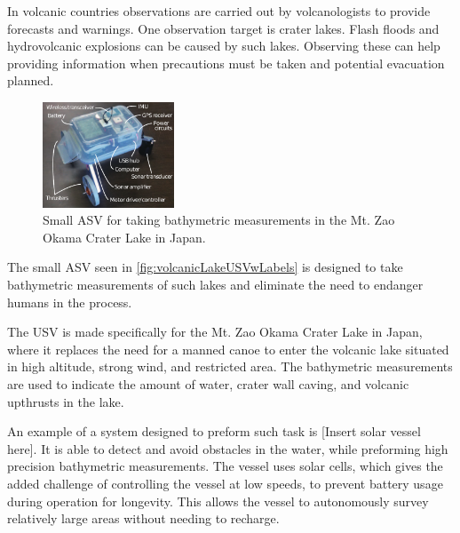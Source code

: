 In volcanic countries observations are carried out by volcanologists to provide forecasts and warnings. One observation target is crater lakes. Flash floods and hydrovolcanic explosions can be caused by such lakes. Observing these can help providing information when precautions must be taken and potential evacuation planned.\cite{AWatanabe}
%
\begin{figure}[H]
  \includegraphics[width=0.35\textwidth]{figures/volcanicLakeUSVwLabels.pdf}
  \caption{Small ASV for taking bathymetric measurements in the Mt. Zao Okama Crater Lake in Japan.\cite{AWatanabe}}
  \label{fig:volcanicLakeUSVwLabels}
\end{figure}
\vspace{-6mm}
%
The small ASV seen in \autoref{fig:volcanicLakeUSVwLabels} is designed to take bathymetric measurements of such lakes and eliminate the need to endanger humans in the process.\cite{AWatanabe}

The USV is made specifically for the Mt. Zao Okama Crater Lake in Japan, where it replaces the need for a manned canoe to enter the volcanic lake situated in high
altitude, strong wind, and restricted area. The bathymetric measurements are used to indicate the amount of water, crater wall caving, and volcanic upthrusts in the lake.\cite{AWatanabe}

An example of a system designed to preform such task is [Insert solar vessel here]. 
It is able to detect and avoid obstacles in the water, while preforming high precision bathymetric measurements. 
The vessel uses solar cells, which gives the added challenge of controlling the vessel at low speeds, to prevent battery usage during operation for longevity. 
This allows the vessel to autonomously survey relatively large areas without needing to recharge.
 


